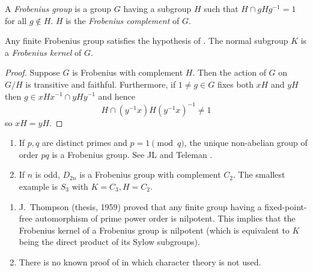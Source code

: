 \documentclass[a4paper]{article}
\theoremstyle{definition}
\begin{document}
\begin{definition}
  A \emph{Frobenius group} is a group \(G\) having a subgroup \(H\) such that \(H \cap gHg^{-1} = 1\) for all \(g \notin H\). \(H\) is the \emph{Frobenius complement} of \(G\).
\end{definition}

\begin{proposition}
  Any finite Frobenius group satisfies the hypothesis of . The normal subgroup \(K\) is a \emph{Frobenius kernel} of \(G\).
\end{proposition}

\begin{proof}
  Suppose \(G\) is Frobenius with complement \(H\). Then the action of \(G\) on \(G/H\) is transitive and faithful. Furthermore, if \(1 \neq g \in G\) fixes both \(xH\) and \(yH\) then \(g \in xHx^{-1} \cap yHy^{-1}\) and hence
  \[
    H \cap (y^{-1}x) H (y^{-1} x)^{-1} \neq 1
  \]
  so \(xH = yH\).
\end{proof}

\begin{eg}\leavevmode
  \begin{enumerate}
  \item If \(p, q\) are distinct primes and \(p = 1 \pmod q\), the unique non-abelian group of order \(pq\) is a Frobenius group. See JL  and Teleman .
  \item If \(n\) is odd, \(D_{2n}\) is a Frobenius group with complement \(C_2\). The smallest example is \(S_3\) with \(K = C_3, H = C_2\).
  \end{enumerate}
\end{eg}

\begin{remark}\leavevmode
  \begin{enumerate}
  \item J.\ Thompson (thesis, 1959) proved that any finite group having a fixed-point-free automorphism of prime power order is nilpotent. This implies that the Frobenius kernel of a Frobenius group is nilpotent (which is equivalent to \(K\) being the direct product of its Sylow subgroups).
  \item There is no known proof of  in which character theory is not used.
  \end{enumerate}
\end{remark}
\end{document}
